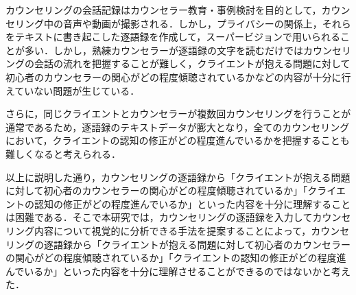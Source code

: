 \documentclass[shuuron]{kuee}
\begin{document}

カウンセリングの会話記録はカウンセラー教育・事例検討を目的として，カウンセリング中の音声や動画が撮影される．しかし，プライバシーの関係上，それらをテキストに書き起こした逐語録を作成して，スーパービジョンで用いられることが多い．しかし，熟練カウンセラーが逐語録の文字を読むだけではカウンセリングの会話の流れを把握することが難しく，クライエントが抱える問題に対して初心者のカウンセラーの関心がどの程度傾聴されているかなどの内容が十分に行えていない問題が生じている．


さらに，同じクライエントとカウンセラーが複数回カウンセリングを行うことが通常であるため，逐語録のテキストデータが膨大となり，全てのカウンセリングにおいて，クライエントの認知の修正がどの程度進んでいるかを把握することも難しくなると考えられる．%


以上に説明した通り，カウンセリングの逐語録から「クライエントが抱える問題に対して初心者のカウンセラーの関心がどの程度傾聴されているか」「クライエントの認知の修正がどの程度進んでいるか」といった内容を十分に理解することは困難である．そこで本研究では，カウンセリングの逐語録を入力してカウンセリング内容について視覚的に分析できる手法を提案することによって，カウンセリングの逐語録から「クライエントが抱える問題に対して初心者のカウンセラーの関心がどの程度傾聴されているか」「クライエントの認知の修正がどの程度進んでいるか」といった内容を十分に理解させることができるのではないかと考えた．
\end{document}
